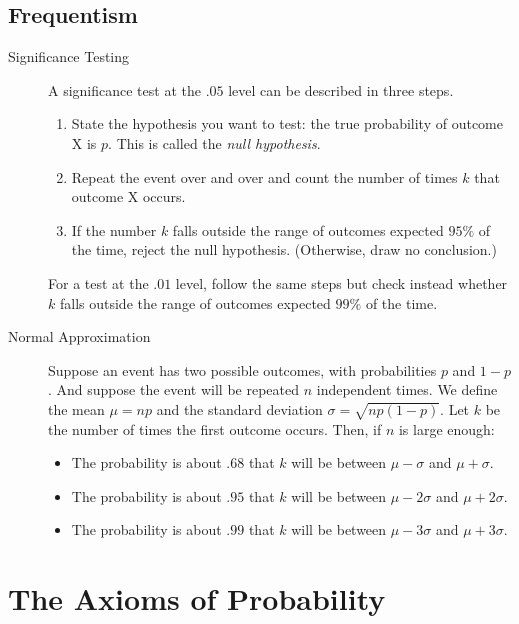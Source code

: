 \documentclass[justified]{tufte-book}
\providecommand{\tightlist}{%
  \setlength{\itemsep}{0pt}\setlength{\parskip}{0pt}}
\theoremstyle{definition}
\theoremstyle{definition}
\theoremstyle{definition}
\theoremstyle{definition}
\theoremstyle{remark}
\begin{document}
\hypertarget{frequentism-1}{%
\section*{Frequentism}\label{frequentism-1}}

\begin{description}
\item[Significance Testing]
A significance test at the \(.05\) level can be described in three steps.

\begin{enumerate}
\def\labelenumi{\arabic{enumi}.}
\tightlist
\item
  State the hypothesis you want to test: the true probability of outcome X is \(p\). This is called the \emph{null hypothesis}.
\item
  Repeat the event over and over and count the number of times \(k\) that outcome X occurs.
\item
  If the number \(k\) falls outside the range of outcomes expected \(95\%\) of the time, reject the null hypothesis. (Otherwise, draw no conclusion.)
\end{enumerate}

For a test at the \(.01\) level, follow the same steps but check instead whether \(k\) falls outside the range of outcomes expected \(99\%\) of the time.
\item[Normal Approximation]
Suppose an event has two possible outcomes, with probabilities \(p\) and \(1-p\). And suppose the event will be repeated \(n\) independent times. We define the mean \(\mu = np\) and the standard deviation \(\sigma = \sqrt{np(1-p)}\). Let \(k\) be the number of times the first outcome occurs. Then, if \(n\) is large enough:

\begin{itemize}
\tightlist
\item
  The probability is about \(.68\) that \(k\) will be between \(\mu - \sigma\) and \(\mu + \sigma\).
\item
  The probability is about \(.95\) that \(k\) will be between \(\mu - 2\sigma\) and \(\mu + 2\sigma\).
\item
  The probability is about \(.99\) that \(k\) will be between \(\mu - 3\sigma\) and \(\mu + 3\sigma\).
\end{itemize}
\end{description}

\hypertarget{the-axioms-of-probability}{%
\chapter{The Axioms of Probability}\label{the-axioms-of-probability}}
\end{document}
